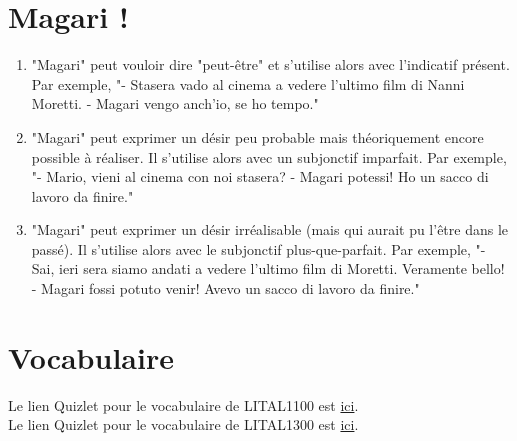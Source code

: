 \documentclass[12pt, openany]{report}
\begin{document}
\section{Magari !}
\begin{enumerate}
    \item "Magari" peut vouloir dire "peut-être" et s'utilise alors avec l'indicatif présent. Par exemple, "- Stasera vado al cinema a vedere l'ultimo film di Nanni Moretti. - Magari vengo anch'io, se ho tempo."
    \item "Magari" peut exprimer un désir peu probable mais théoriquement encore possible à réaliser. Il s'utilise alors avec un subjonctif imparfait. Par exemple, "- Mario, vieni al cinema con noi stasera? - Magari potessi! Ho un sacco di lavoro da finire."
    \item "Magari" peut exprimer un désir irréalisable (mais qui aurait pu l'être dans le passé). Il s'utilise alors avec le subjonctif plus-que-parfait. Par exemple, "- Sai, ieri sera siamo andati a vedere l'ultimo film di Moretti. Veramente bello! - Magari fossi potuto venir! Avevo un sacco di lavoro da finire."
\end{enumerate}
\section{Vocabulaire}
Le lien Quizlet pour le vocabulaire de LITAL1100 est \href{https://quizlet.com/be/1006471421/lital1100-q2-flash-cards/}{ici}.\\
Le lien Quizlet pour le vocabulaire de LITAL1300 est \href{https://quizlet.com/be/1083840558/lital1300-flash-cards/?i=2qogk5&x=1jqt}{ici}.
\end{document}
